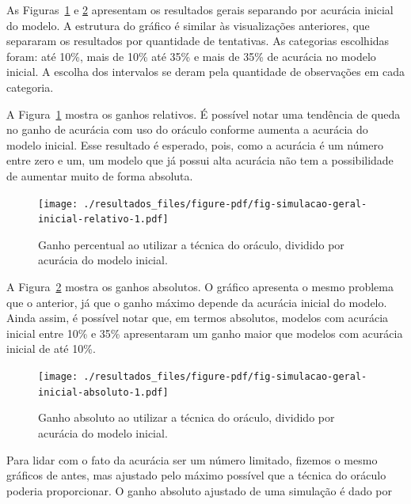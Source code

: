 \documentclass[12pt,twoside,brazilian]{book}
\begin{document}
As Figuras~\ref{fig-simulacao-geral-inicial-relativo} e
\ref{fig-simulacao-geral-inicial-absoluto} apresentam os resultados
gerais separando por acurácia inicial do modelo. A estrutura do gráfico
é similar às visualizações anteriores, que separaram os resultados por
quantidade de tentativas. As categorias escolhidas foram: até 10\%, mais
de 10\% até 35\% e mais de 35\% de acurácia no modelo inicial. A escolha
dos intervalos se deram pela quantidade de observações em cada
categoria.

A Figura~\ref{fig-simulacao-geral-inicial-relativo} mostra os ganhos
relativos. É possível notar uma tendência de queda no ganho de acurácia
com uso do oráculo conforme aumenta a acurácia do modelo inicial. Esse
resultado é esperado, pois, como a acurácia é um número entre zero e um,
um modelo que já possui alta acurácia não tem a possibilidade de
aumentar muito de forma absoluta.

\begin{figure}

{\centering \texttt{[image: ./resultados\_files/figure-pdf/fig-simulacao-geral-inicial-relativo-1.pdf]}

}

\caption{\label{fig-simulacao-geral-inicial-relativo}Ganho percentual ao
utilizar a técnica do oráculo, dividido por acurácia do modelo inicial.}

\end{figure}

A Figura~\ref{fig-simulacao-geral-inicial-absoluto} mostra os ganhos
absolutos. O gráfico apresenta o mesmo problema que o anterior, já que o
ganho máximo depende da acurácia inicial do modelo. Ainda assim, é
possível notar que, em termos absolutos, modelos com acurácia inicial
entre 10\% e 35\% apresentaram um ganho maior que modelos com acurácia
inicial de até 10\%.

\begin{figure}

{\centering \texttt{[image: ./resultados\_files/figure-pdf/fig-simulacao-geral-inicial-absoluto-1.pdf]}

}

\caption{\label{fig-simulacao-geral-inicial-absoluto}Ganho absoluto ao
utilizar a técnica do oráculo, dividido por acurácia do modelo inicial.}

\end{figure}

Para lidar com o fato da acurácia ser um número limitado, fizemos o
mesmo gráficos de antes, mas ajustado pelo máximo possível que a técnica
do oráculo poderia proporcionar. O ganho absoluto ajustado de uma
simulação é dado por
\end{document}

